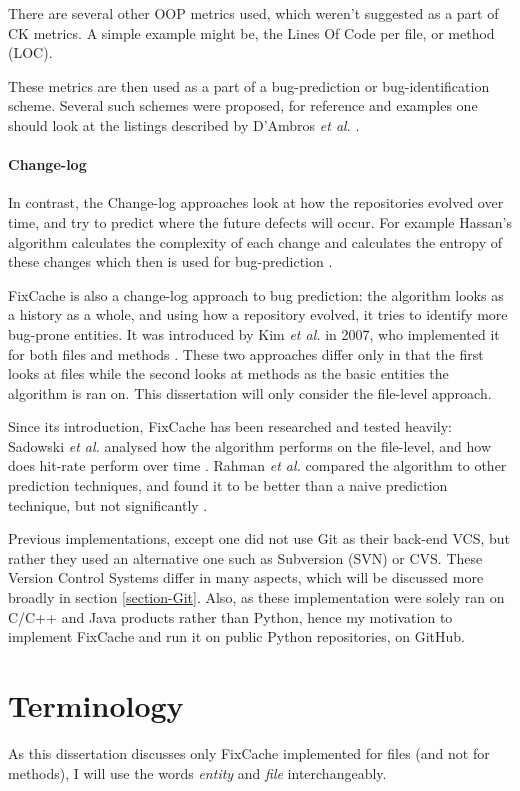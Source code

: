 \documentclass[12pt,twoside,notitlepage]{report}
\newcommand{\fxch}{FixCache}
\newcommand{\etal}{\textit{et al.}}
\begin{document}
There are several other OOP metrics used, which weren't suggested as a part of CK metrics. A simple example might be, the Lines Of Code per file, or method (LOC).

These metrics are then used as a part of a bug-prediction or bug-identification scheme. Several such schemes were proposed, for reference and examples one should look at the listings described by D'Ambros \textit{et al.} \cite{5463279}.

\paragraph{Change-log}In contrast, the Change-log approaches look at how the repositories evolved over time, and try to predict where the future defects will occur. For example Hassan's algorithm calculates the complexity of each change and calculates the entropy of these changes which then is used for bug-prediction \cite{hassan}.

\fxch{} is also a change-log approach to bug prediction: the algorithm looks as a history as a whole, and using how a repository evolved, it tries to identify more bug-prone entities. It was introduced by Kim \textit{et al.} in 2007, who implemented it for both files and methods \cite{FixCache}. These two approaches differ only in that the first looks at files while the second looks at methods as the basic entities the algorithm is ran on. This dissertation will only consider the file-level approach.

Since its introduction, \fxch{} has been researched and tested heavily: Sadowski \etal{} analysed how the algorithm performs on the file-level, and how does hit-rate perform over time \cite{Sadowski}. Rahman \etal{} compared the algorithm to other prediction techniques, and found it to be better than a naive prediction technique, but not significantly \cite{Bugcache}.

Previous implementations\cite{FixCache}\cite{Sadowski}, except one\cite{Bugcache} did not use Git\cite{TorvaldsGit} as their back-end VCS, but rather they used an alternative one such as Subversion (SVN) or CVS. These Version Control Systems differ in many aspects, which will be discussed more broadly in section \ref{section-Git}. Also, as these implementation were solely ran on C/C++ and Java products rather than Python, hence my motivation to implement \fxch{} and run it on public Python repositories, on GitHub.
\section{Terminology}
As this dissertation discusses only \fxch{} implemented for files (and not for methods), I will use the words \textit{entity} and \textit{file} interchangeably.
\end{document}
